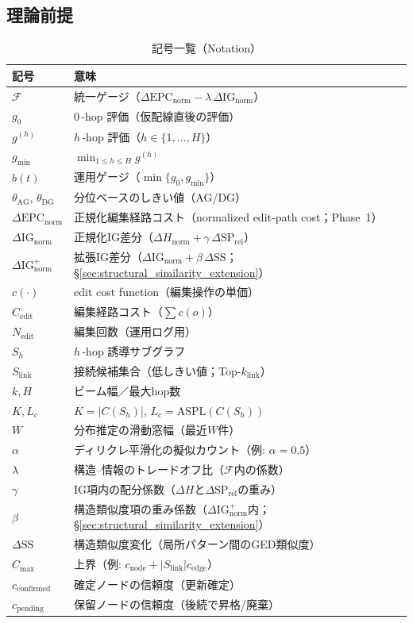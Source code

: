\documentclass[ja=standard,xelatex]{bxjsarticle}
\newcommand{\F}{\mathcal{F}}
\newcommand{\gednorm}{\Delta\mathrm{EPC}_{\mathrm{norm}}}
\newcommand{\ignorm}{\Delta\mathrm{IG}_{\mathrm{norm}}}
\begin{document}
\subsection{理論前提}\label{sec:graph_model_premise}
\begin{table}[H]
  \centering
  \small
  \begin{tabular}{ll}
    \toprule
    記号 & 意味 \\
    \midrule
    $\F$ & 統一ゲージ（$\gednorm - \lambda\,\ignorm$） \\
    $g_0$ & 0\,\mbox{-}hop 評価（仮配線直後の評価） \\
    $g^{(h)}$ & $h$\,\mbox{-}hop 評価（$h\in\{1,\dots,H\}$） \\
    $g_{\min}$ & $\min_{1\le h\le H} g^{(h)}$ \\
    $b(t)$ & 運用ゲージ（$\min\{g_0, g_{\min}\}$） \\
    $\theta_{\mathrm{AG}},\,\theta_{\mathrm{DG}}$ & 分位ベースのしきい値（AG/DG） \\
    $\gednorm$ & 正規化編集経路コスト（normalized edit‑path cost；Phase~1） \\
    $\ignorm$ & 正規化IG差分（$\Delta H_{\mathrm{norm}}{+}\gamma\,\Delta \mathrm{SP}_{\mathrm{rel}}$） \\
    $\ignorm^{+}$ & 拡張IG差分（$\ignorm{+}\beta\,\Delta\mathrm{SS}$；\S\ref{sec:structural_similarity_extension}） \\
    $c(\cdot)$ & edit cost function（編集操作の単価） \\
    $C_{\mathrm{edit}}$ & 編集経路コスト（$\sum c(o)$） \\
    $N_{\mathrm{edit}}$ & 編集回数（運用ログ用） \\
    $S_h$ & $h$\,\mbox{-}hop 誘導サブグラフ \\
    $S_{\mathrm{link}}$ & 接続候補集合（低しきい値；Top-$k_{\mathrm{link}}$） \\
    $k, H$ & ビーム幅／最大hop数 \\
    $K, L_c$ & $K{=}|C(S_h)|$, $L_c{=}\mathrm{ASPL}(C(S_h))$ \\
    $W$ & 分布推定の滑動窓幅（最近$W$件） \\
    $\alpha$ & ディリクレ平滑化の擬似カウント（例: $\alpha{=}0.5$） \\
    $\lambda$ & 構造–情報のトレードオフ比（$\F$内の係数） \\
    $\gamma$ & IG項内の配分係数（$\Delta H$と$\Delta\mathrm{SP}_{\mathrm{rel}}$の重み） \\
    $\beta$ & 構造類似度項の重み係数（$\ignorm^{+}$内；\S\ref{sec:structural_similarity_extension}） \\
    $\Delta\mathrm{SS}$ & 構造類似度変化（局所パターン間のGED類似度） \\
    $C_{\max}$ & 上界（例: $c_{\mathrm{node}}{+}|S_{\mathrm{link}}|c_{\mathrm{edge}}$） \\
    $c_{\mathrm{confirmed}}$ & 確定ノードの信頼度（更新確定） \\
    $c_{\mathrm{pending}}$ & 保留ノードの信頼度（後続で昇格/廃棄） \\
    \bottomrule
  \end{tabular}
  \caption{記号一覧（Notation）}
  \label{tab:notation}
\end{table}
\end{document}
